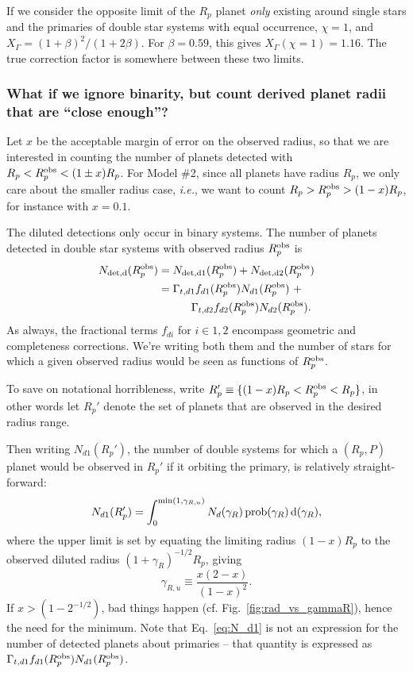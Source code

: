 \documentclass{emulateapj}
\begin{document}
If we consider the opposite limit of the $R_p$ planet \textit{only} 
existing around single stars and the primaries of double star systems with 
equal occurrence, $\chi = 1$, and $X_\Gamma = (1 +\beta)^2 / (1+2\beta)$.
For $\beta = 0.59$, this gives $X_\Gamma(\chi=1) = 1.16$.
The true correction factor is somewhere between these two limits.



\subsubsection{What if we ignore binarity, but count derived planet radii that 
are ``close enough''?}
\label{sec:close_enough}

Let $x$ be the acceptable margin of error on the observed radius, so that we 
are interested in counting the number of planets detected with $R_p < R_p^{\rm 
obs} < (1\pm x) R_p$.
For Model \#2, since all planets have radius $R_p$, we only care about 
the smaller radius case, \textit{i.e.}, we want to count $R_p > R_p^{\rm 
	obs} > (1 - x) R_p$, for instance with $x=0.1$.

The diluted detections only occur in binary systems. The number of 
planets detected in double star systems with observed radius $R_p^{\rm obs}$ 
is
\begin{align}
N_{\rm det,d}(R_p^{\rm obs}) &= N_{\rm det, d1}(R_p^{\rm obs}) + 
								N_{\rm det, d2}(R_p^{\rm obs}) \\
&= \Gamma_{t,d1} f_{d1}(R_p^{\rm obs}) N_{d1}(R_p^{\rm obs})\  + \nonumber \\
&\quad\quad \quad\Gamma_{t,d2} f_{d2}(R_p^{\rm obs}) N_{d2}(R_p^{\rm obs}).
\end{align}
As always, the fractional terms $f_{di}$ for $i\in{1,2}$ encompass geometric 
and completeness corrections.
We're writing both them and the number of stars for which a given observed 
radius would be seen as functions of $R_p^{\rm obs}$.

To save on notational horribleness, write $R_p' \equiv \{(1-x) R_p < R_p^{\rm 
obs} < R_p\}$, in other words let $R_p'$ denote the set of planets that are 
observed in the desired radius range.

Then writing $N_{d1}(R_p')$, the number of double systems for which a $(R_p, 
P)$ planet would be observed in $R_p'$ if it orbiting the primary, is 
relatively straight-forward:
\begin{equation}
N_{d1}(R_p') = \int_{0}^{{\rm min}(1,\gamma_{R,u})} N_d(\gamma_R) 
\,{\rm prob}(\gamma_R) \,{\rm d}(\gamma_R),
\label{eq:N_d1}
\end{equation}
where the upper limit is set by equating the limiting radius $(1-x)R_p$ to the 
observed diluted radius $(1+\gamma_R)^{-1/2}R_p$, giving
\begin{equation}
\gamma_{R,u} \equiv \frac{x (2-x)}{(1-x)^2}.
\end{equation}
If $x > (1 - 2^{-1/2})$, bad things happen (cf. Fig.~\ref{fig:rad_vs_gammaR}), 
hence the need for the minimum.
Note that Eq.~\ref{eq:N_d1} is not an expression for the number of detected 
planets about primaries -- that quantity is expressed as $\Gamma_{t,d1} 
f_{d1}(R_p^{\rm obs}) N_{d1}(R_p^{\rm obs})$.
\end{document}
